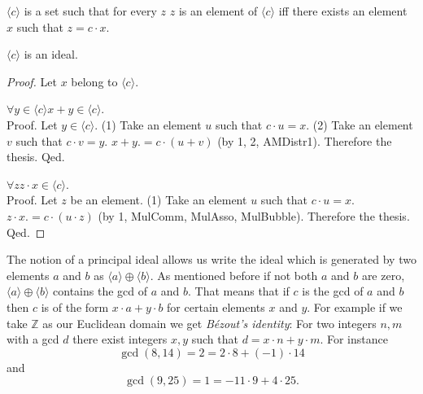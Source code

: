 \documentclass{article}
\newcommand{\Int}{\mathbb{Z}}
\begin{document}
  \begin{forthel}
    \begin{definition}[DefPrIdeal]
      $\langle c \rangle$ is a set such that for every $z$ $z$ is an element of
      $\langle c \rangle$ iff there exists an element $x$ such that
      $z = c \cdot x$.
    \end{definition}

    \begin{lemma}[PrIdeal]
      $\langle c \rangle$ is an ideal.
    \end{lemma}
    \begin{proof}
      Let $x$ belong to $\langle c \rangle$.

      $\forall y \in \langle c \rangle x + y \in \langle c \rangle$. \\
      Proof.
        Let $y \in \langle c \rangle$.
        (1) Take an element $u$ such that $c \cdot u = x$.
        (2) Take an element $v$ such that $c \cdot v = y$.
        $x + y .= c \cdot (u + v)$ (by 1, 2, AMDistr1).
        Therefore the thesis.
      Qed.

      $\forall z z \cdot x \in \langle c \rangle$. \\
      Proof.
        Let $z$ be an element.
        (1) Take an element $u$ such that $c \cdot u = x$.
        $z \cdot x .= c \cdot (u \cdot z)$ (by 1, MulComm, MulAsso, MulBubble).
        Therefore the thesis.
      Qed.
    \end{proof}
  \end{forthel}

  The notion of a principal ideal allows us write the ideal which is generated
  by two elements $a$ and $b$ as $\langle a \rangle \oplus \langle b \rangle$.
  As mentioned before if not both $a$ and $b$ are zero,
  $\langle a \rangle \oplus \langle b \rangle$ contains the gcd of $a$ and $b$.
  That means that if $c$ is the gcd of $a$ and $b$ then $c$ is of the form
  $x \cdot a + y \cdot b$ for certain elements $x$ and $y$. For example if we
  take $\Int$ as our Euclidean domain we get \textit{Bézout's identity}: For two
  integers $n,m$ with a gcd $d$ there exist integers $x,y$ such that
  $d = x \cdot n + y \cdot m$. For instance
  \[ \gcd(8,14) = 2 = 2 \cdot 8 + (-1) \cdot 14 \]
  and
  \[ \gcd(9,25) = 1 = -11 \cdot 9 + 4 \cdot 25. \]
\end{document}
